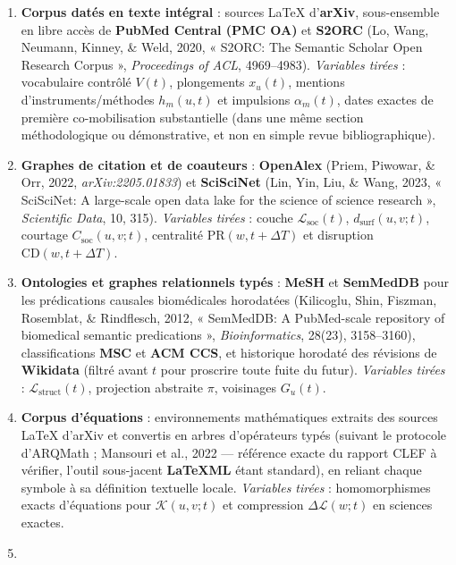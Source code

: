 \documentclass[a4paper,11pt]{article}
\providecommand{\tightlist}{\setlength{\itemsep}{0pt}\setlength{\parskip}{0pt}}
\begin{document}
\begin{enumerate}
\def\labelenumi{\arabic{enumi}.}
\tightlist
\item
  \textbf{Corpus datés en texte intégral} : sources LaTeX
  d'\textbf{arXiv}, sous-ensemble en libre accès de \textbf{PubMed
  Central (PMC OA)} et \textbf{S2ORC} (Lo, Wang, Neumann, Kinney, \&
  Weld, 2020, « S2ORC: The Semantic Scholar Open Research Corpus »,
  \emph{Proceedings of ACL}, 4969--4983). \emph{Variables tirées} :
  vocabulaire contrôlé \(V(t)\), plongements \(x_u(t)\), mentions
  d'instruments/méthodes \(h_m(u,t)\) et impulsions \(\alpha_m(t)\),
  dates exactes de première co-mobilisation substantielle (dans une même
  section méthodologique ou démonstrative, et non en simple revue
  bibliographique).
\item
  \textbf{Graphes de citation et de coauteurs} : \textbf{OpenAlex}
  (Priem, Piwowar, \& Orr, 2022, \emph{arXiv:2205.01833}) et
  \textbf{SciSciNet} (Lin, Yin, Liu, \& Wang, 2023, « SciSciNet: A
  large-scale open data lake for the science of science research »,
  \emph{Scientific Data}, 10, 315). \emph{Variables tirées} : couche
  \(\mathcal{L}_{\text{soc}}(t)\), \(d_{\text{surf}}(u,v;t)\), courtage
  \(C_{\text{soc}}(u,v;t)\), centralité \(\text{PR}(w, t+\Delta T)\) et
  disruption \(\text{CD}(w, t+\Delta T)\).
\item
  \textbf{Ontologies et graphes relationnels typés} : \textbf{MeSH} et
  \textbf{SemMedDB} pour les prédications causales biomédicales
  horodatées (Kilicoglu, Shin, Fiszman, Rosemblat, \& Rindflesch, 2012,
  « SemMedDB: A PubMed-scale repository of biomedical semantic
  predications », \emph{Bioinformatics}, 28(23), 3158--3160),
  classifications \textbf{MSC} et \textbf{ACM CCS}, et historique
  horodaté des révisions de \textbf{Wikidata} (filtré avant \(t\) pour
  proscrire toute fuite du futur). \emph{Variables tirées} :
  \(\mathcal{L}_{\text{struct}}(t)\), projection abstraite \(\pi\),
  voisinages \(G_u(t)\).
\item
  \textbf{Corpus d'équations} : environnements mathématiques extraits
  des sources LaTeX d'arXiv et convertis en arbres d'opérateurs typés
  (suivant le protocole d'ARQMath ; Mansouri et al., 2022 --- référence
  exacte du rapport CLEF à vérifier, l'outil sous-jacent
  \textbf{LaTeXML} étant standard), en reliant chaque symbole à sa
  définition textuelle locale. \emph{Variables tirées} : homomorphismes
  exacts d'équations pour \(\mathcal{K}(u,v;t)\) et compression
  \(\Delta \mathcal{L}(w;t)\) en sciences exactes.
\item

\end{enumerate}
\end{document}

